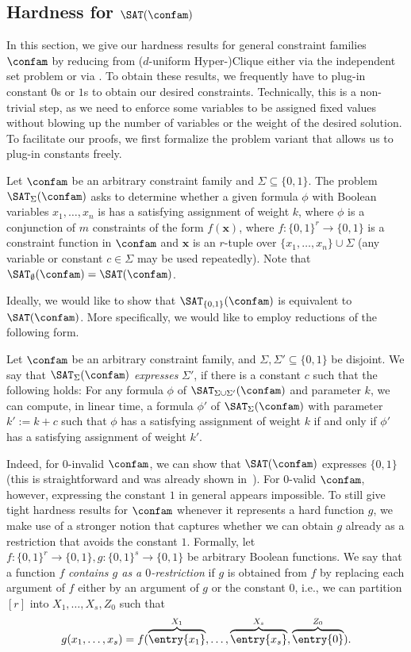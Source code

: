 \subsection{Hardness for $\SAT(\confam)$}
%
In this section, we give our hardness results for general constraint families $\confam$ by reducing from ($d$-uniform Hyper-)Clique either via the independent set problem or via \Implication.
%
To obtain these results, we frequently have to plug-in constant $0$s or $1$s to obtain our desired constraints. Technically, this is a non-trivial step, as we need to enforce some variables to be assigned fixed values without blowing up the number of variables or the weight of the desired solution. To facilitate our proofs, we first formalize the problem variant that allows us to plug-in constants freely.
\begin{defn}
Let $\confam$ be an arbitrary constraint family and $\Sigma\subseteq \{0,1\}$. The problem $\SAT_\Sigma(\confam)$ asks to determine whether a given formula $\phi$ with Boolean variables $x_1,\dots, x_n$ is has a satisfying assignment of weight $k$, where $\phi$ is a conjunction of $m$ constraints of the form $f(\mathbf{x})$, where $f:\{0,1\}^r \to \{0,1\}$ is a constraint function in $\confam$ and $\mathbf{x}$ is an $r$-tuple over $\{x_1,\dots, x_n\} \cup \Sigma$ (any variable or constant $c\in \Sigma$ may be used repeatedly). Note that $\SAT_\emptyset(\confam) = \SAT(\confam)$.
\end{defn}
%
Ideally, we would like to show that $\SAT_{\{0,1\}}(\confam)$ is equivalent to $\SAT(\confam)$. More specifically, we would like to employ reductions of the following form. 
\begin{defn}
Let $\confam$ be an arbitrary constraint family, and $\Sigma,\Sigma' \subseteq \{0,1\}$ be disjoint. We say that $\SAT_\Sigma(\confam)$ \emph{expresses} $\Sigma'$, if there is a constant $c$ such that the following holds: For any formula $\phi$ of $\SAT_{\Sigma\cup \Sigma'}(\confam)$ and parameter $k$, we can compute, in linear time, a formula $\phi'$ of $\SAT_\Sigma(\confam)$ with parameter $k':= k + c$ such that $\phi$ has a satisfying assignment of weight $k$ if and only if $\phi'$ has a satisfying assignment of weight $k'$.
\end{defn}
%
Indeed, for $0$-invalid $\confam$, we can show that $\SAT(\confam)$ expresses $\{0,1\}$ (this is straightforward and was already shown in~\cite{Marx05}). For $0$-valid $\confam$, however, expressing the constant $1$ in general appears impossible. To still give tight hardness results for $\confam$ whenever it represents a hard function $g$, we make use of a stronger notion that captures whether we can obtain $g$ already as a restriction that avoids the constant $1$.
Formally, let $f:\{0,1\}^r \to \{0,1\}, g:\{0,1\}^s\to \{0,1\}$ be arbitrary Boolean functions. We say that a function $f$ \emph{contains $g$ as a $0$-restriction} if $g$ is obtained from $f$ by replacing each argument of $f$ either by an argument of $g$ or the constant $0$, i.e., we can partition $[r]$ into $X_1,\dots, X_s, Z_0$ such that 
\[ g(x_1,\dots,x_s) = f(\overbrace{\entry{x_1}}^{X_1}, \dots, \overbrace{\entry{x_s}}^{X_s}, \overbrace{\entry{0}}^{Z_0}).\]
%
  
